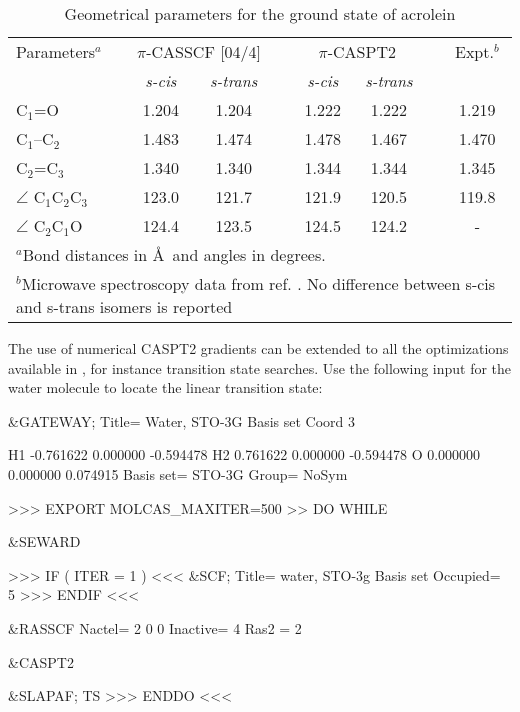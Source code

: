 \begin{table}[h]
\begin{center}
\caption{Geometrical parameters for the ground state of acrolein}
\label{tab:geo-acrol}
\begin{tabular}{lccccccc}
\hline\hline
Parameters$^a$ &  \multicolumn{2}{c}{$\pi$-CASSCF [04/4]} & & \multicolumn{2}{c}{$\pi$-CASPT2} & & Expt.$^b$ \\
\cline{2-3}\cline{5-6}\cline{8-8}
    & \em{s-cis} &    \em{s-trans} & & \em{s-cis}    &  \em{s-trans} &   &  \\ \hline
C$_1$=O          &   1.204   &     1.204   & & 1.222  & 1.222 &   &   1.219   \\
C$_1$--C$_2$     &   1.483   &     1.474   & & 1.478  & 1.467 &   &   1.470   \\
C$_2$=C$_3$      &   1.340   &      1.340  & & 1.344  & 1.344 &   &   1.345   \\
$\angle$ C$_1$C$_2$C$_3$  & 123.0 & 121.7  & & 121.9  & 120.5 &   &   119.8   \\
$\angle$ C$_2$C$_1$O      & 124.4 & 123.5  & & 124.5  & 124.2 &   &	-     \\
\hline
\multicolumn{8}{l}{$^a$\scriptsize{Bond distances in \AA\ and angles in degrees.}}\\
\multicolumn{8}{l}{$^b$\scriptsize{Microwave spectroscopy data from ref.
\cite{Blom:82}.
 No difference between s-cis and s-trans isomers is reported}}
                \end{tabular}
        \end{center}
\end{table}

The use of numerical CASPT2 gradients can be extended to all the optimizations
available in , for instance transition state searches.
Use the following input for the water molecule to locate the linear
transition state:

\begin{inputlisting}
&GATEWAY; Title= Water, STO-3G Basis set
   Coord
   3

   H1   -0.761622       0.000000      -0.594478
   H2    0.761622       0.000000      -0.594478
   O     0.000000       0.000000       0.074915
   Basis set= STO-3G
   Group= NoSym

>>> EXPORT MOLCAS_MAXITER=500
>> DO WHILE

&SEWARD

>>> IF ( ITER = 1 ) <<<
&SCF; Title= water, STO-3g Basis set
Occupied= 5
>>> ENDIF <<<

&RASSCF
Nactel= 2 0 0
Inactive= 4
Ras2    = 2

&CASPT2

&SLAPAF; TS
>>> ENDDO <<<
\end{inputlisting}

